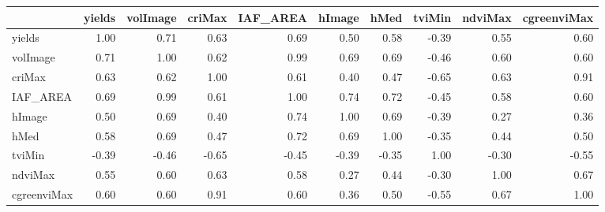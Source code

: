 \begin{tabular}{lrrrrrrrrr}
\toprule
{} &  yields &  volImage &  criMax &  IAF\_AREA &  hImage &  hMed &  tviMin &  ndviMax &  cgreenviMax \\
\midrule
yields      &    1.00 &      0.71 &    0.63 &      0.69 &    0.50 &  0.58 &   -0.39 &     0.55 &         0.60 \\
volImage    &    0.71 &      1.00 &    0.62 &      0.99 &    0.69 &  0.69 &   -0.46 &     0.60 &         0.60 \\
criMax      &    0.63 &      0.62 &    1.00 &      0.61 &    0.40 &  0.47 &   -0.65 &     0.63 &         0.91 \\
IAF\_AREA    &    0.69 &      0.99 &    0.61 &      1.00 &    0.74 &  0.72 &   -0.45 &     0.58 &         0.60 \\
hImage      &    0.50 &      0.69 &    0.40 &      0.74 &    1.00 &  0.69 &   -0.39 &     0.27 &         0.36 \\
hMed        &    0.58 &      0.69 &    0.47 &      0.72 &    0.69 &  1.00 &   -0.35 &     0.44 &         0.50 \\
tviMin      &   -0.39 &     -0.46 &   -0.65 &     -0.45 &   -0.39 & -0.35 &    1.00 &    -0.30 &        -0.55 \\
ndviMax     &    0.55 &      0.60 &    0.63 &      0.58 &    0.27 &  0.44 &   -0.30 &     1.00 &         0.67 \\
cgreenviMax &    0.60 &      0.60 &    0.91 &      0.60 &    0.36 &  0.50 &   -0.55 &     0.67 &         1.00 \\
\bottomrule
\end{tabular}
